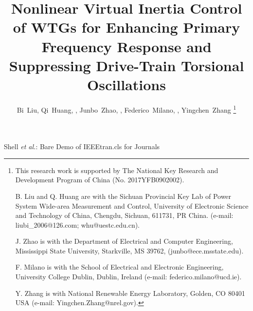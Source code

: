 \documentclass[journal]{IEEEtran}
\begin{document}
\title{Nonlinear Virtual Inertia Control of WTGs for Enhancing Primary Frequency Response and Suppressing Drive-Train Torsional Oscillations}

\author{{Bi~Liu, Qi~Huang, ,
    Junbo~Zhao, , Federico~Milano,
    , Yingchen~Zhang  }%
  \thanks{This research work is supported by The National Key Research
    and Development Program of China (No. 2017YFB0902002).
    \par B. Liu and Q. Huang are with the Sichuan Provincial Key Lab of Power System Wide-area Measurement and Control, University of Electronic
    Science and Technology of China, Chengdu, Sichuan, 611731, PR China. (e-mail: liubi\_2006@126.com; whu@uestc.edu.cn).
    \par J. Zhao is with the Department of Electrical and Computer Engineering, Mississippi State University, Starkville, MS 39762, (junbo@ece.msstate.edu).
    \par F. Milano is with the School of Electrical and Electronic
    Engineering, University College Dublin, Dublin, Ireland (e-mail:
    federico.milano@ucd.ie).
    \par Y. Zhang is with National Renewable Energy Laboratory, Golden, CO 80401 USA (e-mail: Yingchen.Zhang@nrel.gov).}}%

%
{Shell \MakeLowercase{\textit{et al.}}: Bare Demo of IEEEtran.cls for Journals}
\maketitle
\end{document}
